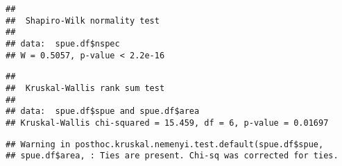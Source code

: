 \documentclass[]{article}
\newenvironment{Shaded}{\begin{snugshade}}{\end{snugshade}}
\newcommand{\KeywordTok}[1]{\textcolor[rgb]{0.13,0.29,0.53}{\textbf{#1}}}
\newcommand{\DataTypeTok}[1]{\textcolor[rgb]{0.13,0.29,0.53}{#1}}
\newcommand{\DecValTok}[1]{\textcolor[rgb]{0.00,0.00,0.81}{#1}}
\newcommand{\StringTok}[1]{\textcolor[rgb]{0.31,0.60,0.02}{#1}}
\newcommand{\CommentTok}[1]{\textcolor[rgb]{0.56,0.35,0.01}{\textit{#1}}}
\newcommand{\OperatorTok}[1]{\textcolor[rgb]{0.81,0.36,0.00}{\textbf{#1}}}
\newcommand{\NormalTok}[1]{#1}
\begin{document}
\begin{Shaded}
\end{Shaded}

\begin{verbatim}
## 
##  Shapiro-Wilk normality test
## 
## data:  spue.df$nspec
## W = 0.5057, p-value < 2.2e-16
\end{verbatim}

\begin{Shaded}
\end{Shaded}

\begin{verbatim}
## 
##  Kruskal-Wallis rank sum test
## 
## data:  spue.df$spue and spue.df$area
## Kruskal-Wallis chi-squared = 15.459, df = 6, p-value = 0.01697
\end{verbatim}

\begin{Shaded}
\end{Shaded}

\begin{verbatim}
## Warning in posthoc.kruskal.nemenyi.test.default(spue.df$spue,
## spue.df$area, : Ties are present. Chi-sq was corrected for ties.
\end{verbatim}
\end{document}
